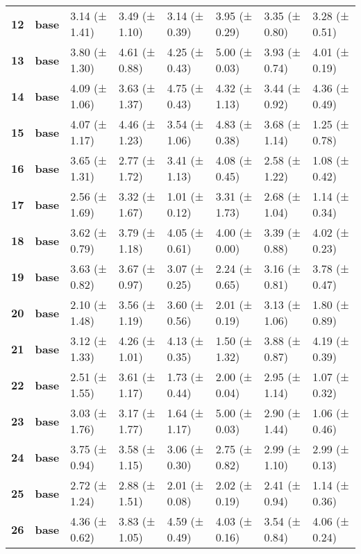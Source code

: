 \begin{longtable}{llllllll}
\cline{1-8}
\textbf{12} & \textbf{base} & 3.14 (± 1.41) & 3.49 (± 1.10) & 3.14 (± 0.39) & 3.95 (± 0.29) & 3.35 (± 0.80) & 3.28 (± 0.51) \\
\cline{1-8}
\textbf{13} & \textbf{base} & 3.80 (± 1.30) & 4.61 (± 0.88) & 4.25 (± 0.43) & 5.00 (± 0.03) & 3.93 (± 0.74) & 4.01 (± 0.19) \\
\cline{1-8}
\textbf{14} & \textbf{base} & 4.09 (± 1.06) & 3.63 (± 1.37) & 4.75 (± 0.43) & 4.32 (± 1.13) & 3.44 (± 0.92) & 4.36 (± 0.49) \\
\cline{1-8}
\textbf{15} & \textbf{base} & 4.07 (± 1.17) & 4.46 (± 1.23) & 3.54 (± 1.06) & 4.83 (± 0.38) & 3.68 (± 1.14) & 1.25 (± 0.78) \\
\cline{1-8}
\textbf{16} & \textbf{base} & 3.65 (± 1.31) & 2.77 (± 1.72) & 3.41 (± 1.13) & 4.08 (± 0.45) & 2.58 (± 1.22) & 1.08 (± 0.42) \\
\cline{1-8}
\textbf{17} & \textbf{base} & 2.56 (± 1.69) & 3.32 (± 1.67) & 1.01 (± 0.12) & 3.31 (± 1.73) & 2.68 (± 1.04) & 1.14 (± 0.34) \\
\cline{1-8}
\textbf{18} & \textbf{base} & 3.62 (± 0.79) & 3.79 (± 1.18) & 4.05 (± 0.61) & 4.00 (± 0.00) & 3.39 (± 0.88) & 4.02 (± 0.23) \\
\cline{1-8}
\textbf{19} & \textbf{base} & 3.63 (± 0.82) & 3.67 (± 0.97) & 3.07 (± 0.25) & 2.24 (± 0.65) & 3.16 (± 0.81) & 3.78 (± 0.47) \\
\cline{1-8}
\textbf{20} & \textbf{base} & 2.10 (± 1.48) & 3.56 (± 1.19) & 3.60 (± 0.56) & 2.01 (± 0.19) & 3.13 (± 1.06) & 1.80 (± 0.89) \\
\cline{1-8}
\textbf{21} & \textbf{base} & 3.12 (± 1.33) & 4.26 (± 1.01) & 4.13 (± 0.35) & 1.50 (± 1.32) & 3.88 (± 0.87) & 4.19 (± 0.39) \\
\cline{1-8}
\textbf{22} & \textbf{base} & 2.51 (± 1.55) & 3.61 (± 1.17) & 1.73 (± 0.44) & 2.00 (± 0.04) & 2.95 (± 1.14) & 1.07 (± 0.32) \\
\cline{1-8}
\textbf{23} & \textbf{base} & 3.03 (± 1.76) & 3.17 (± 1.77) & 1.64 (± 1.17) & 5.00 (± 0.03) & 2.90 (± 1.44) & 1.06 (± 0.46) \\
\cline{1-8}
\textbf{24} & \textbf{base} & 3.75 (± 0.94) & 3.58 (± 1.15) & 3.06 (± 0.30) & 2.75 (± 0.82) & 2.99 (± 1.10) & 2.99 (± 0.13) \\
\cline{1-8}
\textbf{25} & \textbf{base} & 2.72 (± 1.24) & 2.88 (± 1.51) & 2.01 (± 0.08) & 2.02 (± 0.19) & 2.41 (± 0.94) & 1.14 (± 0.36) \\
\cline{1-8}
\textbf{26} & \textbf{base} & 4.36 (± 0.62) & 3.83 (± 1.05) & 4.59 (± 0.49) & 4.03 (± 0.16) & 3.54 (± 0.84) & 4.06 (± 0.24) \\

\end{longtable}
